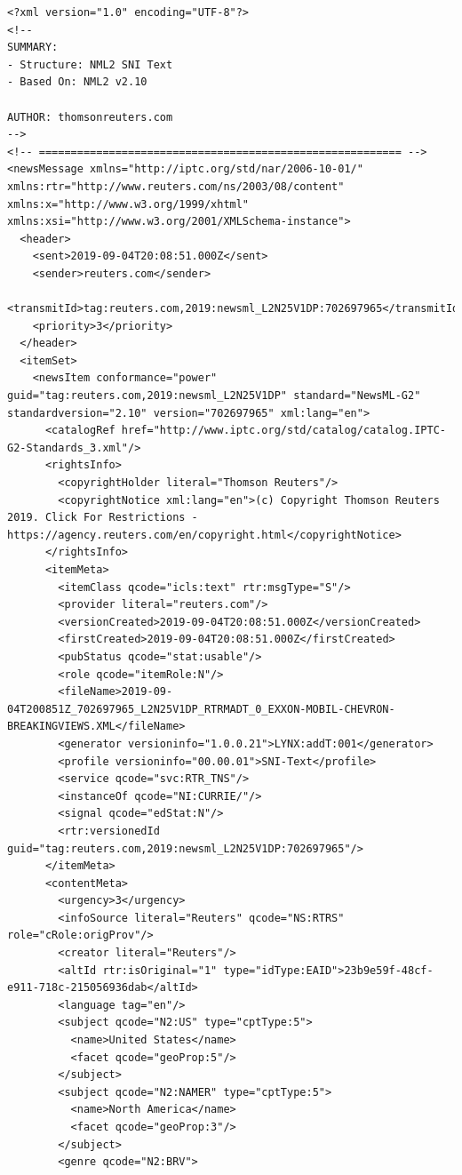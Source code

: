 \documentclass[11pt]{article}
\begin{document}
\begin{lstlisting}
<?xml version="1.0" encoding="UTF-8"?>
<!-- 
SUMMARY: 
- Structure: NML2 SNI Text 
- Based On: NML2 v2.10

AUTHOR: thomsonreuters.com
-->
<!-- ========================================================= -->
<newsMessage xmlns="http://iptc.org/std/nar/2006-10-01/" xmlns:rtr="http://www.reuters.com/ns/2003/08/content" xmlns:x="http://www.w3.org/1999/xhtml" xmlns:xsi="http://www.w3.org/2001/XMLSchema-instance">
  <header>
    <sent>2019-09-04T20:08:51.000Z</sent>
    <sender>reuters.com</sender>
    <transmitId>tag:reuters.com,2019:newsml_L2N25V1DP:702697965</transmitId>
    <priority>3</priority>
  </header>
  <itemSet>
    <newsItem conformance="power" guid="tag:reuters.com,2019:newsml_L2N25V1DP" standard="NewsML-G2" standardversion="2.10" version="702697965" xml:lang="en">
      <catalogRef href="http://www.iptc.org/std/catalog/catalog.IPTC-G2-Standards_3.xml"/>
      <rightsInfo>
        <copyrightHolder literal="Thomson Reuters"/>
        <copyrightNotice xml:lang="en">(c) Copyright Thomson Reuters 2019. Click For Restrictions - https://agency.reuters.com/en/copyright.html</copyrightNotice>
      </rightsInfo>
      <itemMeta>
        <itemClass qcode="icls:text" rtr:msgType="S"/>
        <provider literal="reuters.com"/>
        <versionCreated>2019-09-04T20:08:51.000Z</versionCreated>
        <firstCreated>2019-09-04T20:08:51.000Z</firstCreated>
        <pubStatus qcode="stat:usable"/>
        <role qcode="itemRole:N"/>
        <fileName>2019-09-04T200851Z_702697965_L2N25V1DP_RTRMADT_0_EXXON-MOBIL-CHEVRON-BREAKINGVIEWS.XML</fileName>
        <generator versioninfo="1.0.0.21">LYNX:addT:001</generator>
        <profile versioninfo="00.00.01">SNI-Text</profile>
        <service qcode="svc:RTR_TNS"/>
        <instanceOf qcode="NI:CURRIE/"/>
        <signal qcode="edStat:N"/>
        <rtr:versionedId guid="tag:reuters.com,2019:newsml_L2N25V1DP:702697965"/>
      </itemMeta>
      <contentMeta>
        <urgency>3</urgency>
        <infoSource literal="Reuters" qcode="NS:RTRS" role="cRole:origProv"/>
        <creator literal="Reuters"/>
        <altId rtr:isOriginal="1" type="idType:EAID">23b9e59f-48cf-e911-718c-215056936dab</altId>
        <language tag="en"/>
        <subject qcode="N2:US" type="cptType:5">
          <name>United States</name>
          <facet qcode="geoProp:5"/>
        </subject>
        <subject qcode="N2:NAMER" type="cptType:5">
          <name>North America</name>
          <facet qcode="geoProp:3"/>
        </subject>
        <genre qcode="N2:BRV">

\end{lstlisting}
\end{document}
